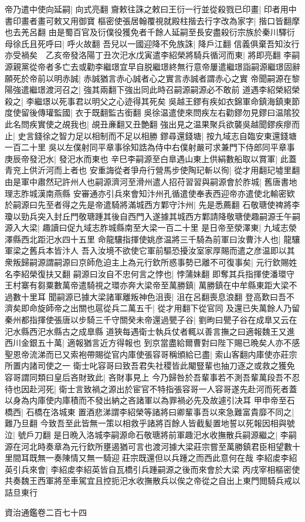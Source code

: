 帝乃遣中使向延嗣|{
	向式亮翻}
齎敕往誅之敕曰王衍一行並從殺戮已印畫|{
	印者用中書印畫者畫可敕又用御寶}
樞密使張居翰覆視就殿柱揩去行字改為家字|{
	揩口皆翻摩也去羌呂翻}
由是蜀百官及衍僕役獲免者千餘人延嗣至長安盡殺衍宗族於秦川驛衍母徐氏且死呼曰|{
	呼火故翻}
吾兒以一國迎降不免族誅|{
	降戶江翻}
信義俱棄吾知汝行亦受禍矣　乙亥帝發洛陽丁丑次汜水戊寅遣李紹榮將騎兵循河而東|{
	將即亮翻}
李嗣源親黨從帝者多亡去或勸李繼璟宜早自脱繼璟終無行意帝屢遣繼璟詣嗣源繼璟固辭願死於帝前以明赤誠|{
	赤誠猶言赤心誠者心之實言赤誠者謂赤心之實}
帝聞嗣源在黎陽強遣繼璟渡河召之|{
	強其兩翻下強出同此時召嗣源嗣源必不敢前}
道遇李紹榮紹榮殺之|{
	李繼璟以死事君以明父之心迹得其死矣}
吳越王鏐有疾如衣錦軍命鎮海鎮東節度使留後傳瓘監國|{
	衣于既翻監古銜翻}
吳徐温遣使來問疾左右勸鏐勿見鏐曰温隂狡此名問疾實使之覘我也|{
	覘丑亷翻又丑艶翻}
強出見之温果聚兵欲襲吳越聞鏐疾瘳而止|{
	史言錢徐之智力足以相制而不足以相勝}
鏐尋還錢塘|{
	按九域志自臨安東還錢塘一百二十里}
吳以左僕射同平章事徐知誥為侍中右僕射嚴可求兼門下侍郎同平章事　庚辰帝發汜水|{
	發汜水而東也}
辛巳李嗣源至白臯遇山東上供絹數船取以賞軍|{
	此蓋青兖上供沂河而上者也}
安重誨從者爭舟行營馬步使陶玘斬以徇|{
	從才用翻玘墟里翻}
由是軍中肅然玘許州人也嗣源濟河至滑州遣人招苻習習與嗣源會於胙城|{
	舊唐書地理志胙城漢南燕縣}
安審通亦引兵來會知汴州孔循遣使奉表西迎帝亦遣使北輸密欵於嗣源曰先至者得之先是帝遣騎將滿城西方鄴守汴州|{
	先是悉薦翻}
石敬瑭使禆將李瓊以勁兵突入封丘門敬瑭踵其後自西門入遂據其城西方鄴請降敬瑭使趣嗣源壬午嗣源入大梁|{
	趣讀曰促九域志胙城縣南至大梁一百二十里}
是日帝至滎澤東|{
	九域志滎澤縣西北距汜水四十五里}
命龍驤指揮使姚彦温將三千騎為前軍曰汝曹汴人也|{
	龍驤軍梁之舊兵本皆汴人}
吾入汝境不欲使它軍前驅恐擾汝室家厚賜而遣之彦温即以其衆叛歸嗣源謂嗣源曰京師危迫主上為元行欽所惑事勢已離不可復事矣|{
	元行欽賜姓名李紹榮復扶又翻}
嗣源曰汝自不忠何言之悖也|{
	悖蒲妹翻}
即奪其兵指揮使潘環守王村寨有芻粟數萬帝遣騎視之環亦奔大梁帝至萬勝鎮|{
	萬勝鎮在中牟縣東距大梁不過數十里耳}
聞嗣源已據大梁諸軍離叛神色沮喪|{
	沮在呂翻喪息浪翻}
登高歎曰吾不濟矣即命旋師帝之出關也扈從兵二萬五千|{
	從才用翻下從官同}
及還已失萬餘人乃留秦州都指揮使張唐以步騎三千守關癸未帝還過甖子谷|{
	劉昫曰甖子谷在成臯又云在汜水縣西汜水縣古之成臯縣}
道狹每遇衛士執兵仗者輒以善言撫之曰適報魏王又進西川金銀五十萬|{
	適報猶言近方得報也}
到京當盡給爾曹對曰陛下賜已晩矣人亦不感聖恩帝流涕而已又索袍帶賜從官内庫使張容哥稱頒給已盡|{
	索山客翻内庫使亦莊宗所置内諸司使之一}
衛士叱容哥曰致吾君失社稷皆此閹豎輩也抽刀逐之或救之獲免容哥謂同類曰皇后吝財致此|{
	吝財事見上}
今乃歸咎於吾輩事若不測吾輩萬段吾不忍待也因赴河死|{
	衛士言致禍之源出於宦官不特指張容哥一人容哥遂先赴河而死者蓋以身為内庫使内庫積而不發出納之吝諸軍以為罪禍必先及故遽引决耳}
甲申帝至石橋西|{
	石橋在洛城東}
置酒悲涕謂李紹榮等諸將曰卿輩事吾以來急難富貴靡不同之|{
	難乃旦翻}
今致吾至此皆無一策以相救乎諸將百餘人皆截髪置地誓以死報因相與號泣|{
	號戶刀翻}
是日晩入洛城李嗣源命石敬瑭將前軍趣汜水收撫散兵嗣源繼之|{
	李嗣源在河北時奏章為元行欽所壅遏猶可言也渡河據大梁莊宗嘗至萬勝鎮君臣相望數十里間耳既無一奏陳情又無一騎迎莊宗既還但以兵踵之而西此意何在哉}
李紹䖍李紹英引兵來會|{
	李紹䖍李紹英皆自瓦橋引兵踵嗣源之後而來會於大梁}
丙戌宰相樞密使共奏魏王西軍將至車駕宜且控扼汜水收撫散兵以俟之帝從之自出上東門閲騎兵戒以詰旦東行

資治通鑑卷二百七十四
